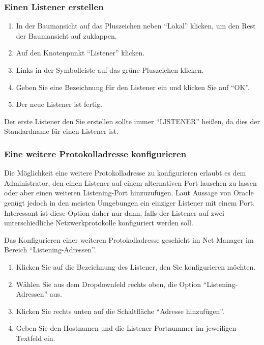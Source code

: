         \subsubsection{Einen Listener erstellen}
          \begin{enumerate}
            \item In der Baumansicht auf das Pluszeichen neben \enquote{Lokal} klicken, um den Rest der Baumansicht auf zuklappen.
            \item Auf den Knotenpunkt \enquote{Listener} klicken.
            \item Links in der Symbolleiste auf das grüne Pluszeichen klicken.
\clearpage
            \item Geben Sie eine Bezeichnung für den Listener ein und klicken Sie auf \enquote{OK}.
            \item Der neue Listener ist fertig.
          \end{enumerate}
          \begin{merke}
            Der erste Listener den Sie erstellen sollte immer \enquote{LISTENER} heißen, da dies der Standardname für einen Listener ist.
          \end{merke}
        \subsubsection{Eine weitere Protokolladresse konfigurieren}
          \label{protocoladdresses}
          Die Möglichkeit eine weitere Protokolladresse zu konfigurieren erlaubt es dem Administrator, den einen Listener auf einem alternativen Port lauschen zu lassen oder aber einen weiteren Listening-Port hinzuzufügen. Laut Aussage von Oracle genügt jedoch in den meisten Umgebungen ein einziger Listener mit einem Port. Interessant ist diese Option daher nur dann, falls der Listener auf zwei unterschiedliche Netzwerkprotokolle konfiguriert werden soll.

          Das Konfigurieren einer weiteren Protokolladresse geschieht im Net Manager im Bereich \enquote{Listening-Adressen}.
          \begin{enumerate}
            \item Klicken Sie auf die Bezeichnung des Listener, den Sie konfigurieren möchten.
            \item Wählen Sie aus dem Dropdownfeld rechts oben, die Option \enquote{Listening-Adressen} aus.
            \item Klicken Sie rechts unten auf die Schaltfläche \enquote{Adresse hinzufügen}.
            \item Geben Sie den Hostnamen und die Listener Portnummer im jeweiligen Textfeld ein.
          \end{enumerate}

